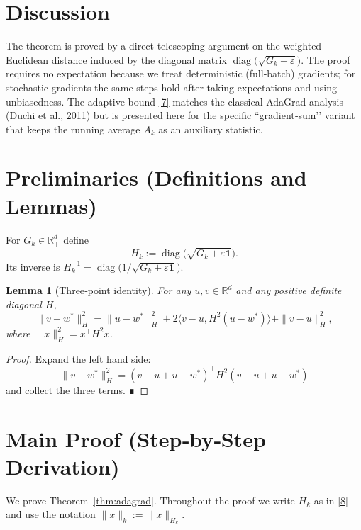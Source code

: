 \documentclass{article}
\newtheorem{lemma}{Lemma}
\newcommand{\R}{\mathbb{R}}
\newcommand{\ip}[2]{\langle #1,#2\rangle}
\begin{document}
\section*{Discussion}
The theorem is proved by a direct telescoping argument on the
weighted Euclidean distance induced by the diagonal matrix
$\operatorname{diag}\!\bigl(\sqrt{G_{k}+\varepsilon}\bigr)$. The proof
requires no expectation because we treat deterministic (full‑batch)
gradients; for stochastic gradients the same steps hold after taking
expectations and using unbiasedness. The adaptive bound \eqref{7}
matches the classical AdaGrad analysis (Duchi et al., 2011) but is
presented here for the specific “gradient‑sum’’ variant that keeps the
running average $A_{k}$ as an auxiliary statistic.

\section*{Preliminaries (Definitions and Lemmas)}
\begin{definition}
For $G_{k}\in\R^{d}_{+}$ define
\[
H_{k}:=\operatorname{diag}\!\bigl(\sqrt{G_{k}+\varepsilon\mathbf 1}\bigr).
\tag{8}
\]
Its inverse is $H_{k}^{-1}= \operatorname{diag}\!\bigl(1/\sqrt{G_{k}+\varepsilon\mathbf 1}\bigr)$.
\end{definition}
\begin{lemma}[Three‑point identity]\label{lem:three}
For any $u,v\in\R^{d}$ and any positive definite diagonal $H$,
\[
\|v-w^{\ast}\|_{H}^{2}
= \|u-w^{\ast}\|_{H}^{2}
+2\ip{v-u}{H^{2}(u-w^{\ast})}
+ \|v-u\|_{H}^{2},
\tag{9}
\]
where $\|x\|_{H}^{2}=x^{\top}H^{2}x$.
\end{lemma}
\begin{proof}
Expand the left hand side:
\[
\|v-w^{\ast}\|_{H}^{2}
=(v-u+u-w^{\ast})^{\top}H^{2}(v-u+u-w^{\ast})
\]
and collect the three terms. ∎
\end{proof}

\section*{Main Proof (Step‑by‑Step Derivation)}
We prove Theorem~\ref{thm:adagrad}. Throughout the proof we write
$H_{k}$ as in \eqref{8} and use the notation
$\|x\|_{k}:=\|x\|_{H_{k}}$.
\end{document}
